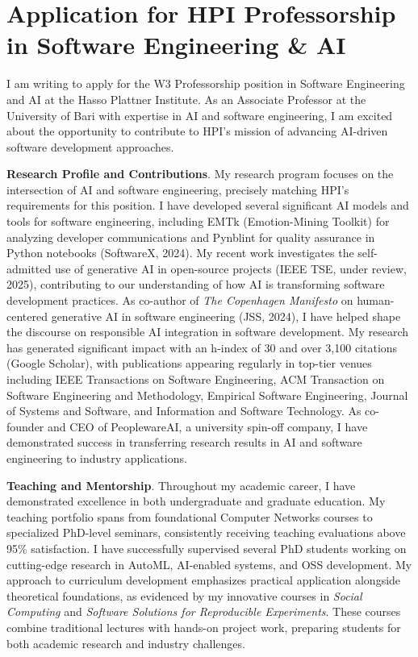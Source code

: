 \section{Application for HPI Professorship in Software Engineering \& AI}

I am writing to apply for the W3 Professorship position in Software Engineering and AI at the Hasso Plattner Institute.
As an Associate Professor at the University of Bari with expertise in AI and software engineering, I am excited about 
the opportunity to contribute to HPI's mission of advancing AI-driven software development approaches.

\textbf{Research Profile and Contributions}.
My research program focuses on the intersection of AI and software engineering, precisely matching HPI's requirements for this position. 
I have developed several significant AI models and tools for software engineering, including EMTk (Emotion-Mining Toolkit) for analyzing developer communications and Pynblint for quality assurance in Python notebooks (SoftwareX, 2024).
My recent work investigates the self-admitted use of generative AI in open-source projects (IEEE TSE, under review, 2025), contributing to our understanding of how AI is transforming software development practices. 
As co-author of \textit{The Copenhagen Manifesto} on human-centered generative AI in software engineering (JSS, 2024), I have helped shape the discourse on responsible AI integration in software development. 
My research has generated significant impact with an h-index of 30 and over 3,100 citations (Google Scholar), with publications appearing regularly in top-tier venues including IEEE Transactions on Software Engineering, ACM Transaction on Software Engineering and Methodology, Empirical Software Engineering, Journal of Systems and Software, and Information and Software Technology.
As co-founder and CEO of PeoplewareAI, a university spin-off company, I have demonstrated success in transferring research results in AI and software engineering to industry applications. 

\textbf{Teaching and Mentorship}.
Throughout my academic career, I have demonstrated excellence in both undergraduate and graduate education. 
My teaching portfolio spans from foundational Computer Networks courses to specialized PhD-level seminars, consistently receiving teaching evaluations above 95\% satisfaction. 
I have successfully supervised several PhD students working on cutting-edge research in AutoML, AI-enabled systems, and OSS development. 
My approach to curriculum development emphasizes practical application alongside theoretical foundations, as evidenced by my innovative courses in \textit{Social Computing} and \textit{Software Solutions for Reproducible Experiments}.
These courses combine traditional lectures with hands-on project work, preparing students for both academic research and industry challenges.

